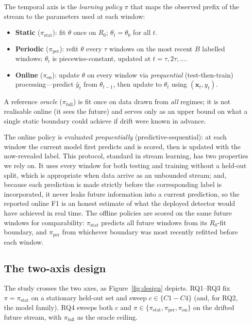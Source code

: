 \documentclass[acmsmall]{acmart}
\begin{document}
The temporal axis is the \emph{learning policy} $\pi$ that maps the observed prefix of the stream to the parameters used at each window:
\begin{itemize}
  \item \textbf{Static} ($\pi_{\text{stat}}$): fit $\theta$ once on $R_0$; $\theta_t = \theta_0$ for all $t$.
  \item \textbf{Periodic} ($\pi_{\text{per}}$): refit $\theta$ every $\tau$ windows on the most recent $B$ labelled windows; $\theta_t$ is piecewise-constant, updated at $t = \tau, 2\tau, \dots$.
  \item \textbf{Online} ($\pi_{\text{on}}$): update $\theta$ on every window via \emph{prequential} (test-then-train) processing---predict $\hat{y}_t$ from $\theta_{t-1}$, then update to $\theta_t$ using $(\mathbf{x}_t, y_t)$.
\end{itemize}
A reference \emph{oracle} ($\pi_{\text{full}}$) is fit once on data drawn from \emph{all} regimes; it is not realisable online (it sees the future) and serves only as an upper bound on what a single static boundary could achieve if drift were known in advance.

The online policy is evaluated \emph{prequentially} (predictive-sequential): at each window the current model first predicts and is scored, then is updated with the now-revealed label. This protocol, standard in stream learning, has two properties we rely on. It uses every window for both testing and training without a held-out split, which is appropriate when data arrive as an unbounded stream; and, because each prediction is made strictly before the corresponding label is incorporated, it never leaks future information into a current prediction, so the reported online F1 is an honest estimate of what the deployed detector would have achieved in real time. The offline policies are scored on the same future windows for comparability: $\pi_{\text{stat}}$ predicts all future windows from its $R_0$-fit boundary, and $\pi_{\text{per}}$ from whichever boundary was most recently refitted before each window.

\subsection{The two-axis design}\label{sec:prob-design}

The study crosses the two axes, as Figure~\ref{fig:design} depicts. RQ1--RQ3 fix $\pi = \pi_{\text{stat}}$ on a stationary held-out set and sweep $c \in \{C1{-}C4\}$ (and, for RQ2, the model family). RQ4 sweeps both $c$ and $\pi \in \{\pi_{\text{stat}}, \pi_{\text{per}}, \pi_{\text{on}}\}$ on the drifted future stream, with $\pi_{\text{full}}$ as the oracle ceiling.
\end{document}
